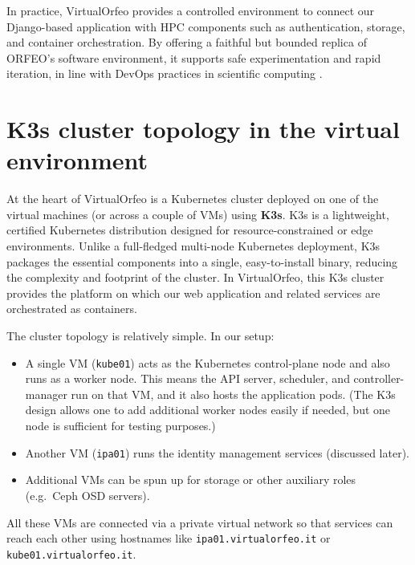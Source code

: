 \medskip

In practice, VirtualOrfeo provides a controlled environment to connect our Django-based application with HPC components such as authentication, storage, and container orchestration. By offering a faithful but bounded replica of ORFEO’s software environment, it supports safe experimentation and rapid iteration, in line with DevOps practices in scientific computing \parencite{Ohmura2023TwdsDT}.


\section{K3s cluster topology in the virtual environment}

At the heart of VirtualOrfeo is a Kubernetes cluster deployed on one of the
virtual machines (or across a couple of VMs) using \textbf{K3s}. K3s is a
lightweight, certified Kubernetes distribution designed for resource-constrained
or edge environments\parencite{Rancher2021K3s}. Unlike a full-fledged multi-node
Kubernetes deployment, K3s packages the essential components into a single,
easy-to-install binary, reducing the complexity and footprint of the cluster. In
VirtualOrfeo, this K3s cluster provides the platform on which our web application
and related services are orchestrated as containers.

\medskip

The cluster topology is relatively simple. In our setup:
\begin{itemize}
	\item A single VM (\texttt{kube01}) acts as the Kubernetes control-plane node
	and also runs as a worker node. This means the API server, scheduler, and
	controller-manager run on that VM, and it also hosts the application pods.
	(The K3s design allows one to add additional worker nodes easily if needed,
	but one node is sufficient for testing purposes.)
	\item Another VM (\texttt{ipa01}) runs the identity management services
	(discussed later).
	\item Additional VMs can be spun up for storage or other auxiliary roles
	(e.g.\ Ceph OSD servers).
\end{itemize}

All these VMs are connected via a private virtual network so that services can
reach each other using hostnames like \texttt{ipa01.virtualorfeo.it} or
\texttt{kube01.virtualorfeo.it}.

